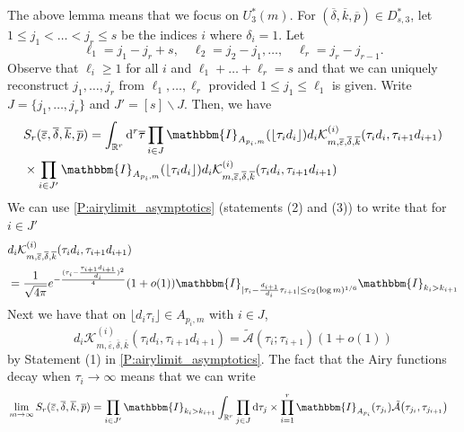 \documentclass[11pt,twoside]{amsart}
\theoremstyle{plain}
\numberwithin{quest}{section}
\theoremstyle{remark}
\numberwithin{rem}{section}
\theoremstyle{definition}
\newcommand{\eps}{\varepsilon}
\begin{document}
The above lemma means that we focus on $U_3^*(m)$. For $(\overline{\delta},\overline{k}, \overline{p}) \in D^*_{s, 3}$, let $1\le j_1<\dots <j_r\leq s$ be the indices $i$ where $\delta_i=1$. Let 
$$
\ell_1=j_1-j_r+s, \quad \ell_2=j_2-j_1, \dots, \quad \ell_r=j_r-j_{r-1}.
$$
Observe that $\ell_i \geq 1$ for all $i$ and $\ell_1+\dots +\ell_r=s$ and that we can uniquely reconstruct $j_1,\dots, j_r$ from $\ell_1,\dots, \ell_r$ provided $1 \leq j_1 \leq \ell_1$ is given.  Write $J=\{j_1,\dots, j_r\}$ and $J'=[s]\backslash J$.  Then, we have
\begin{equation*}
	\begin{split}
		&S_r (\overline{\eps}, \overline{\delta} ,\overline{k},\overline{p}  ) = \int_{\mathbb{R}^r} \mathrm{d}^r \overline{\tau}  \prod_{i \in J}  \mathbbm{I}_{A_{p_i, m}} (\lfloor \tau_i d_i \rfloor)d_i  \mathcal{K}^{(i)}_{m,\overline{\eps},\overline{\delta},\overline{k} } (\tau_i d_i, \tau_{i+1} d_{i+1}) \\
		&\times \prod_{i \in J'}  \mathbbm{I}_{A_{p_i,m}} (\lfloor \tau_id_i \rfloor)d_i  \mathcal{K}^{(i)}_{m,\overline{\eps},\overline{\delta},\overline{k} } (\tau_i d_i , \tau_{i+1} d_{i+1}) 
	\end{split}
\end{equation*}
We can use \cref{P:airylimit_asymptotics} (statements (2) and (3))  to write that for $i \in J'$ 
\begin{equation}\label{E:cumulant:gaussian}
	\begin{split}
		&d_i  \mathcal{K}^{(i)}_{m,\overline{\eps},\overline{\delta},\overline{k} } (\tau_i d_i , \tau_{i+1} d_{i+1}) \\
		&= \frac{1}{\sqrt{4 \pi}} e^{-\frac{(\tau_i-\frac{\tau_{i+1} d_{i+1}}{d_i})^2}{4}} (1+o(1)) \mathbbm{I}_{|\tau_i-\frac{d_{i+1}}{d_i} \tau_{i+1}| \leq c_2 (\log m)^{1/6}} \mathbbm{I}_{k_i>k_{i+1}}
	\end{split}
\end{equation}
Next we have that on $\lfloor d_i \tau_i \rfloor \in A_{p_i,m}$ with $i \in J$, 
\begin{equation*}
	d_i  \mathcal{K}^{(i)}_{m,\overline{\eps},\overline{\delta},\overline{k} } (\tau_i d_i , \tau_{i+1} d_{i+1})=\tilde{\mathcal{A}}(\tau_i;\tau_{i+1})(1+o(1))
\end{equation*}
by Statement (1) in \cref{P:airylimit_asymptotics}. The fact that the Airy functions decay when $\tau_i \to \infty$ means that we can write 
\begin{equation*}
	\begin{split}
		&\lim_{m \to \infty}S_r(\overline{\eps},\overline{\delta},\overline{k},\overline{p})=\prod_{i \in J'}\mathbbm{I}_{k_i>k_{i+1}} 
		\int_{\mathbb{R}^r} \prod_{j \in J}\mathrm{d}\tau_j \times \prod_{i=1}^{r} \mathbbm{I}_{A_{p_i}}(\tau_{j_i})   \tilde{\mathcal{A}}\big(\tau_{j_i},\tau_{j_{i+1}}\big)
	\end{split}
\end{equation*}
\end{document}
